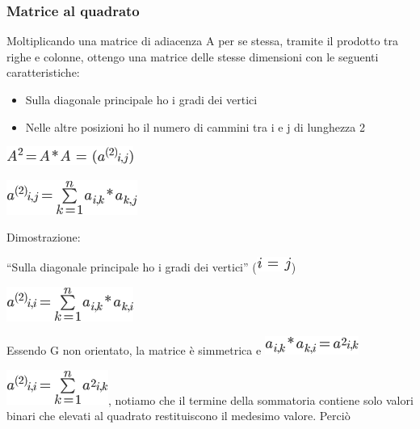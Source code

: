 \documentclass{article}
\providecommand{\tightlist}{%
  \setlength{\itemsep}{0pt}\setlength{\parskip}{0pt}}
\begin{document}
\hypertarget{h.md5vuljp7xm}{\subsubsection{\texorpdfstring{{Matrice al
quadrato}}{Matrice al quadrato}}\label{h.md5vuljp7xm}}

{}

{Moltiplicando una matrice di adiacenza A per se stessa, tramite il
prodotto tra righe e colonne, ottengo una matrice delle stesse
dimensioni con le seguenti caratteristiche:}

\begin{itemize}
\tightlist
\item
  {Sulla diagonale principale ho i gradi dei vertici}
\item
  {Nelle altre posizioni ho il numero di cammini tra i e j di lunghezza
  2}
\end{itemize}

{}

\includegraphics{images/image408.png}

\includegraphics{images/image409.png}

{}

{Dimostrazione}{:}

{``Sulla diagonale principale ho i gradi dei vertici''
(}\includegraphics{images/image410.png}{)}

\includegraphics{images/image411.png}

{Essendo G non orientato, la matrice è simmetrica e
}\includegraphics{images/image412.png}

\includegraphics{images/image413.png}{, notiamo che il termine della
sommatoria contiene solo valori binari che elevati al quadrato
restituiscono il medesimo valore. Perciò}
\end{document}
